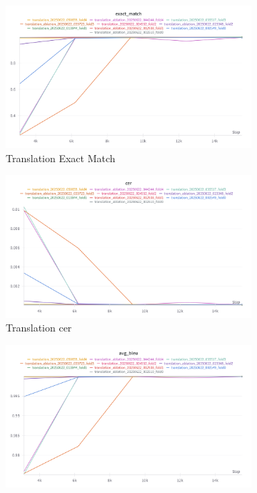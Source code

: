 \documentclass[letterpaper]{article} %
\begin{document}
\begin{figure}[ht]
    \centering
    \begin{subfigure}[b]{0.45\textwidth}
        \centering
        \includegraphics[width=\textwidth]{figures/trans_exact_match.png}
        \caption{Translation Exact Match}
        \label{fig:trans_exact_match}
    \end{subfigure}
    \begin{subfigure}[b]{0.45\textwidth}
        \centering
        \includegraphics[width=\textwidth]{figures/trans_cer.png}
        \caption{Translation cer}
        \label{fig:trans_cer}
    \end{subfigure}
    \begin{subfigure}[b]{0.45\textwidth}
        \centering
        \includegraphics[width=\textwidth]{figures/trans_bleu.png}

\end{subfigure}
\end{figure}
\end{document}
